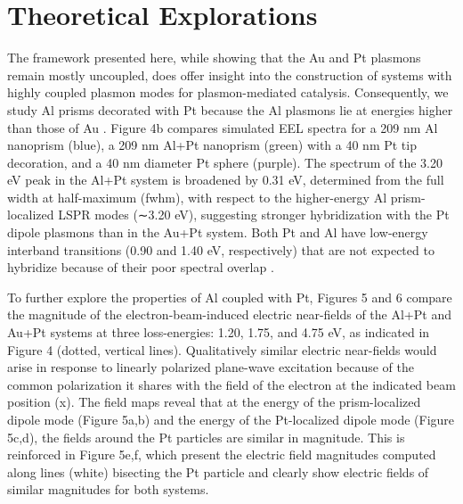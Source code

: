 \documentclass [11pt, proquest] {uwthesis}[2016/11/22]
\begin{document}
\section{Theoretical Explorations}
The framework presented here, while showing that the Au and Pt plasmons remain mostly uncoupled, does offer insight into the construction of systems with highly coupled plasmon modes for plasmon-mediated catalysis. Consequently, we study Al prisms \cite{Aluminum,AluminumHydrogen} decorated with Pt because the Al plasmons lie at energies higher than those of Au \cite{NordHalAluminum}. Figure 4b compares simulated EEL spectra for a 209 nm Al nanoprism (blue), a 209 nm Al+Pt nanoprism (green) with a 40 nm Pt tip decoration, and a 40 nm diameter Pt sphere (purple). The spectrum of the 3.20 eV peak in the Al+Pt system is broadened by 0.31 eV, determined from the full width at half-maximum (fwhm), with respect to the higher-energy Al prism-localized LSPR modes (∼3.20 eV), suggesting stronger hybridization with the Pt dipole plasmons than in the Au+Pt system. Both Pt and Al have low-energy interband transitions (0.90 and 1.40 eV, respectively) that are not expected to hybridize because of their poor spectral overlap \cite{Segall}.

To further explore the properties of Al coupled with Pt, Figures 5 and 6 compare the magnitude of the electron-beam-induced electric near-fields of the Al+Pt and Au+Pt systems at three loss-energies: 1.20, 1.75, and 4.75 eV, as indicated in Figure 4 (dotted, vertical lines). Qualitatively similar electric near-fields would arise in response to linearly polarized plane-wave excitation because of the common polarization it shares with the field of the electron at the indicated beam position (x). The field maps reveal that at the energy of the prism-localized dipole mode (Figure 5a,b) and the energy of the Pt-localized dipole mode (Figure 5c,d), the fields around the Pt particles are similar in magnitude. This is reinforced in Figure 5e,f, which present the electric field magnitudes computed along lines (white) bisecting the Pt particle and clearly show electric fields of similar magnitudes for both systems.
\end{document}
